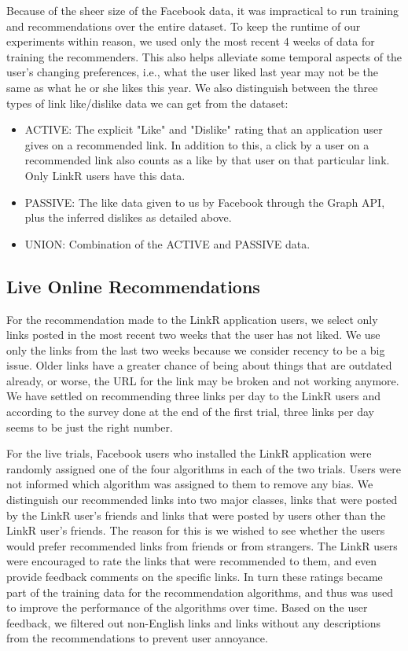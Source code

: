 Because of the sheer size of the Facebook data, it was impractical to run training and recommendations over the entire dataset. To keep the runtime of our experiments within reason, we used only the most recent 4 weeks of data for training the recommenders. This also helps alleviate some temporal aspects of the user's changing preferences, i.e., what the user liked last year may not be the same as what he or she likes this year. We also distinguish between the three types of link like/dislike data we can get from the dataset:

\begin{itemize}
\item {ACTIVE: The explicit "Like" and "Dislike" rating that an application user gives on a recommended link. In addition to this, a click by a user on a recommended link also counts as a like by that user on that particular link. Only LinkR users have this data.}
\item {PASSIVE: The like data given to us by Facebook through the Graph API, plus the inferred dislikes as detailed above. }
\item{UNION: Combination of the ACTIVE and PASSIVE data.}
\end{itemize}

\subsection{Live Online Recommendations}

For the recommendation made to the LinkR application users,  we select only links posted in the most recent two weeks that the user has not liked. We use only the links from the last two weeks because we consider recency to be a big issue. Older links have a greater chance of being about things that are outdated already, or worse, the URL for the link may be broken and not working anymore. We have settled on recommending three links per day to the LinkR users and according to the survey done at the end of the first trial, three links per day seems to be just the right number.

For the live trials, Facebook users who installed the LinkR application were randomly assigned one of the four algorithms in each of the two trials. Users were not informed which algorithm was assigned to them to remove any bias. We distinguish our recommended links into two major classes, links that were posted by the LinkR user's friends and links that were posted by users other than the LinkR user's friends. The reason for this is we wished to see whether the users would prefer recommended links from friends or from strangers. The LinkR users were encouraged to rate the links that were recommended to them, and even provide feedback comments on the specific links. In turn these ratings became part of the training data for the recommendation algorithms, and thus was used to improve the performance of the algorithms over time. Based on the user feedback, we filtered out non-English links and links without any descriptions from the recommendations to prevent user annoyance.


